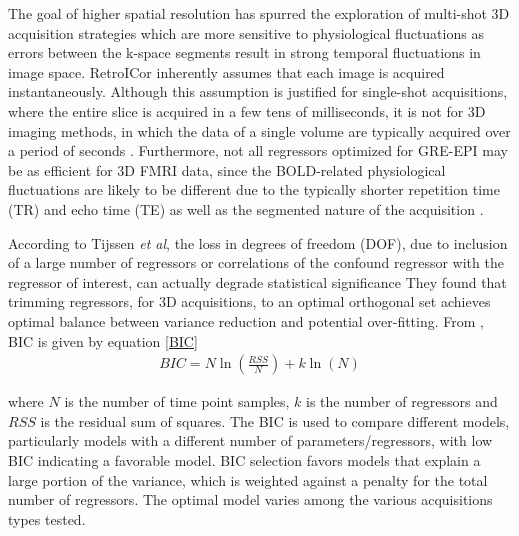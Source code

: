\documentclass[twoside,twocolumn]{article}
\begin{document}
The goal of higher spatial resolution has spurred the exploration of multi-shot 3D acquisition strategies which are more sensitive to physiological fluctuations as errors between the k-space segments result in strong temporal fluctuations in image space\cite{Tijssen2014}.  RetroICor inherently assumes that each image is acquired instantaneously. Although this assumption is justified for single-shot acquisitions, where the entire slice is acquired in a few tens of milliseconds, it is not for 3D imaging methods, in which the data of a single volume are typically acquired over a period of seconds \cite{Tijssen2014}.  Furthermore, not all regressors optimized for GRE-EPI may be as efficient for 3D FMRI data, since the BOLD-related physiological fluctuations are likely to be different due to the typically shorter repetition time (TR) and echo time (TE) as well as the segmented nature of the acquisition \cite{Tijssen2014}.

According to Tijssen {\em et al}\cite{Tijssen2014}, the loss in degrees of freedom (DOF), due to inclusion of a large number of regressors or correlations of the confound regressor with the regressor of interest, can actually degrade statistical significance
They found that trimming regressors, for 3D acquisitions, to an optimal orthogonal set achieves optimal balance between variance reduction and potential over-fitting.  From \cite{Kass1993}, BIC is given by equation \ref{BIC}
\begin{eqnarray}
	BIC = N\ln\left(\frac{RSS}{N}\right)+k\ln(N)
	\label{BIC}
\end{eqnarray}

where $N$ is the number of time point samples, $k$ is the number of regressors and $RSS$ is the residual sum of squares.  The BIC is used to compare different models, particularly models with a different number of parameters/regressors, with low BIC indicating a favorable model. BIC selection favors models that explain a large portion of the variance, which is weighted against a penalty for the total number of regressors\cite{Tijssen2014}.  The optimal model varies among the various acquisitions types tested.
\end{document}

